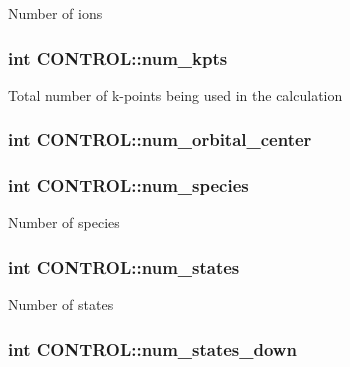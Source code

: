Number of ions \hypertarget{struct_c_o_n_t_r_o_l_aea5d1f19803cbbd22e67f3f439c75cde}{
\subsubsection[{num\-\_\-kpts}]{\setlength{\rightskip}{0pt plus 5cm}int C\-O\-N\-T\-R\-O\-L\-::num\-\_\-kpts}}\label{struct_c_o_n_t_r_o_l_aea5d1f19803cbbd22e67f3f439c75cde}
Total number of k-\/points being used in the calculation \hypertarget{struct_c_o_n_t_r_o_l_accee344004a8938e56311c613788d3ab}{
\subsubsection[{num\-\_\-orbital\-\_\-center}]{\setlength{\rightskip}{0pt plus 5cm}int C\-O\-N\-T\-R\-O\-L\-::num\-\_\-orbital\-\_\-center}}\label{struct_c_o_n_t_r_o_l_accee344004a8938e56311c613788d3ab}
\hypertarget{struct_c_o_n_t_r_o_l_a8bf38d086662656293c413d3a13ece71}{
\subsubsection[{num\-\_\-species}]{\setlength{\rightskip}{0pt plus 5cm}int C\-O\-N\-T\-R\-O\-L\-::num\-\_\-species}}\label{struct_c_o_n_t_r_o_l_a8bf38d086662656293c413d3a13ece71}
Number of species \hypertarget{struct_c_o_n_t_r_o_l_a840c358f050f3f94b1543821ef153c24}{
\subsubsection[{num\-\_\-states}]{\setlength{\rightskip}{0pt plus 5cm}int C\-O\-N\-T\-R\-O\-L\-::num\-\_\-states}}\label{struct_c_o_n_t_r_o_l_a840c358f050f3f94b1543821ef153c24}
Number of states \hypertarget{struct_c_o_n_t_r_o_l_a9a9c9052fe7ae6ba32e09244e4e3c155}{
\subsubsection[{num\-\_\-states\-\_\-down}]{\setlength{\rightskip}{0pt plus 5cm}int C\-O\-N\-T\-R\-O\-L\-::num\-\_\-states\-\_\-down}}\label{struct_c_o_n_t_r_o_l_a9a9c9052fe7ae6ba32e09244e4e3c155}
